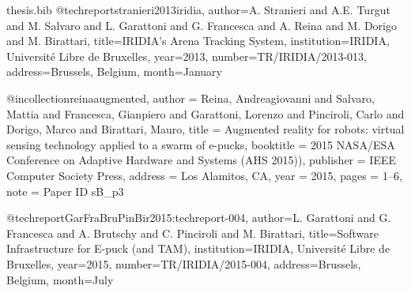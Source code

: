 \documentclass[oneside, a4paper, 12pt]{memoir}
\begin{document}
\begin{filecontents}{thesis.bib}
@techreport{stranieri2013iridia,
  author={A. Stranieri and A.E. Turgut and M. Salvaro and L. Garattoni and G. Francesca and A. Reina and M. Dorigo and  M. Birattari},
  title={IRIDIA's Arena Tracking System},
  institution={IRIDIA, Universit{\'e} Libre de Bruxelles},
  year={2013},
  number={TR/IRIDIA/2013-013},
  address={Brussels, Belgium},
  month={January}
}

@incollection{reinaaugmented,
  author = {Reina, Andreagiovanni and Salvaro, Mattia and Francesca, Gianpiero and Garattoni, Lorenzo and Pinciroli, Carlo and Dorigo, Marco and Birattari, Mauro},
  title = {Augmented reality for robots: virtual sensing technology applied to a swarm of e-pucks},
  booktitle = {2015 {NASA/ESA} Conference on Adaptive Hardware and Systems ({AHS 2015}))},
  publisher = {{IEEE} Computer Society Press},
  address = {Los Alamitos, CA},
  year = {2015},
  pages = {1--6},
  note = {Paper ID sB\_p3}
}

@techreport{GarFraBruPinBir2015:techreport-004,
 author={L. Garattoni and G. Francesca and A. Brutschy and C. Pinciroli and M. Birattari},
 title={Software Infrastructure for E-puck (and TAM)},
 institution={IRIDIA, Universit{\'e} Libre de Bruxelles},
 year={2015},
 number={TR/IRIDIA/2015-004},
 address={Brussels, Belgium},
 month={July}
}

\end{filecontents}



\end{document}
